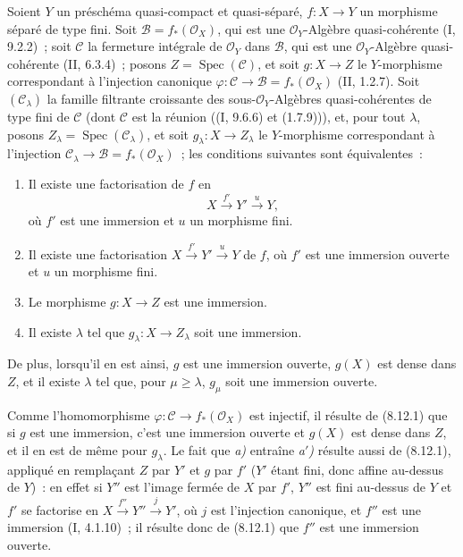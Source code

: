 \begin{proposition}[8.12.3]
Soient $Y$ un préschéma quasi-compact et quasi-séparé, $f:X\to Y$ un
morphisme séparé de type fini. Soit $\mathcal B=f_*(\mathcal O_X)$, qui est
une $\mathcal O_Y$-Algèbre quasi-cohérente (I, 9.2.2)~; soit $\mathcal C$ la
fermeture intégrale de $\mathcal O_Y$ dans $\mathcal B$, qui est une
$\mathcal O_Y$-Algèbre quasi-cohérente (II, 6.3.4)~; posons
$Z=\operatorname{Spec}(\mathcal C)$, et soit $g:X\to Z$ le $Y$-morphisme
correspondant à l'injection canonique
$\varphi:\mathcal C\to\mathcal B=f_*(\mathcal O_X)$ (II, 1.2.7). Soit
$(\mathcal C_\lambda)$ la famille filtrante croissante des
sous-$\mathcal O_Y$-Algèbres quasi-cohérentes de type fini de $\mathcal C$
(dont $\mathcal C$ est la réunion ((I, 9.6.6) et (1.7.9))), et, pour tout
$\lambda$, posons $Z_\lambda=\operatorname{Spec}(\mathcal C_\lambda)$, et
soit $g_\lambda:X\to Z_\lambda$ le $Y$-morphisme correspondant à l'injection
$\mathcal C_\lambda\to\mathcal B=f_*(\mathcal O_X)$~; les conditions
suivantes sont équivalentes~:
\begin{enumerate}
\item[\emph{a)}] Il existe une factorisation de $f$ en
\[
X\xrightarrow{f'}Y'\xrightarrow{u}Y,
\]
où $f'$ est une immersion et $u$ un morphisme fini.
\item[\emph{a$'$)}] Il existe une factorisation
$X\xrightarrow{f'}Y'\xrightarrow{u}Y$ de $f$, où $f'$ est une immersion
ouverte et $u$ un morphisme fini.
\item[\emph{b)}] Le morphisme $g:X\to Z$ est une immersion.
\item[\emph{c)}] Il existe $\lambda$ tel que
$g_\lambda:X\to Z_\lambda$ soit une immersion.
\end{enumerate}
De plus, lorsqu'il en est ainsi, $g$ est une immersion ouverte, $g(X)$ est
dense dans $Z$, et il existe $\lambda$ tel que, pour $\mu\geq\lambda$,
$g_\mu$ soit une immersion ouverte.
\end{proposition}

Comme l'homomorphisme $\varphi:\mathcal C\to f_*(\mathcal O_X)$ est
injectif, il résulte de (8.12.1) que si $g$ est une immersion, c'est une
immersion ouverte et $g(X)$ est dense dans $Z$, et il en est de même pour
$g_\lambda$. Le fait que \emph{a)} entraîne \emph{a$'$)} résulte aussi de
(8.12.1), appliqué en remplaçant $Z$ par $Y'$ et $g$ par $f'$ ($Y'$ étant
fini, donc affine au-dessus de $Y$)~: en effet si $Y''$ est l'image fermée de
$X$ par $f'$, $Y''$ est fini au-dessus de $Y$ et $f'$ se factorise en
$X\xrightarrow{f''}Y''\xrightarrow{j}Y'$, où $j$ est l'injection canonique,
et $f''$ est une immersion (I, 4.1.10)~; il résulte donc de (8.12.1) que
$f''$ est une immersion ouverte.

